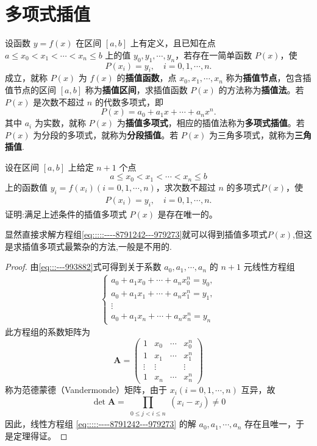 \documentclass[../../main.tex]{subfiles}
\begin{document}
\section{多项式插值}

\begin{definition}
设函数 $y = f(x)$ 在区间 $[a, b]$ 上有定义，且已知在点 $a \leqslant x_0 < x_1 < \cdots < x_n \leqslant b$ 上的值 $y_0, y_1, \cdots, y_n$，若存在一简单函数 $P(x)$，使 
\[
P(x_i) = y_i, \quad i = 0, 1, \cdots, n .
\]
成立，就称 $P(x)$ 为 $f(x)$ 的\textbf{插值函数}，点 $x_0, x_1, \cdots, x_n$ 称为\textbf{插值节点}，包含插值节点的区间 $[a, b]$ 称为\textbf{插值区间}，求插值函数 $P(x)$ 的方法称为\textbf{插值法}。若 $P(x)$ 是次数不超过 $n$ 的代数多项式，即 
\[
P(x) = a_0 + a_1 x + \cdots + a_n x^n .
\]
其中 $a_i$ 为实数，就称 $P(x)$ 为\textbf{插值多项式}，相应的插值法称为\textbf{多项式插值}。若 $P(x)$ 为分段的多项式，就称为\textbf{分段插值}。若 $P(x)$ 为三角多项式，就称为\textbf{三角插值}.
\end{definition}

\begin{theorem}
设在区间 $[a, b]$ 上给定 $n + 1$ 个点 
\[
a \leqslant x_0 < x_1 < \cdots < x_n \leqslant b
\]
上的函数值 $y_i = f(x_i) (i = 0, 1, \cdots, n)$，求次数不超过 $n$ 的多项式$P(x)$，使 
\begin{align}
P(x_i) = y_i, \quad i = 0, 1, \cdots, n.\label{eq:::---993882}
\end{align}
证明:满足上述条件的插值多项式 $P(x)$ 是存在唯一的。
\end{theorem}
\begin{remark}
显然直接求解方程组\eqref{eq:::::----8791242---979273}就可以得到插值多项式$P(x)$,但这是求插值多项式最繁杂的方法,一般是不用的.
\end{remark}
\begin{proof}
由\eqref{eq:::---993882}式可得到关于系数 $a_0, a_1, \cdots, a_n$ 的 $n + 1$ 元线性方程组
\begin{align}
\begin{cases} 
a_0 + a_1 x_0 + \cdots + a_n x_0^n = y_0, \\ 
a_0 + a_1 x_1 + \cdots + a_n x_1^n = y_1, \\ 
\vdots \\ 
a_0 + a_1 x_n + \cdots + a_n x_n^n = y_n 
\end{cases} \label{eq:::::----8791242---979273}
\end{align}
此方程组的系数矩阵为 
\[
\boldsymbol{A} = \begin{pmatrix} 
1 & x_0 & \cdots & x_0^n \\ 
1 & x_1 & \cdots & x_1^n \\ 
\vdots & \vdots & & \vdots \\ 
1 & x_n & \cdots & x_n^n 
\end{pmatrix}
\]
称为范德蒙德（Vandermonde）矩阵，由于 $x_i (i = 0, 1, \cdots, n)$ 互异，故 
\[
\det \boldsymbol{A} = \prod_{\substack{0 \leqslant j < i \leqslant n}} (x_i - x_j) \neq 0
\]
因此，线性方程组 \eqref{eq:::::----8791242---979273} 的解 $a_0, a_1, \cdots, a_n$ 存在且唯一，于是定理得证。

\end{proof}
\end{document}

